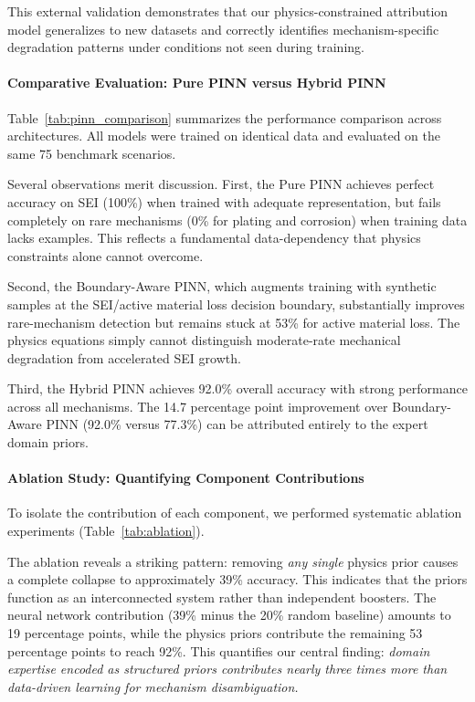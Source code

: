 \documentclass[5p,times,authoryear]{elsarticle}
\begin{document}
This external validation demonstrates that our physics-constrained attribution model generalizes to new datasets and correctly identifies mechanism-specific degradation patterns under conditions not seen during training.

\paragraph{Comparative Evaluation: Pure PINN versus Hybrid PINN}

Table~\ref{tab:pinn_comparison} summarizes the performance comparison across architectures. All models were trained on identical data and evaluated on the same 75 benchmark scenarios.



Several observations merit discussion. First, the Pure PINN achieves perfect accuracy on SEI (100\%) when trained with adequate representation, but fails completely on rare mechanisms (0\% for plating and corrosion) when training data lacks examples. This reflects a fundamental data-dependency that physics constraints alone cannot overcome.

Second, the Boundary-Aware PINN, which augments training with synthetic samples at the SEI/active material loss decision boundary, substantially improves rare-mechanism detection but remains stuck at 53\% for active material loss. The physics equations simply cannot distinguish moderate-rate mechanical degradation from accelerated SEI growth.

Third, the Hybrid PINN achieves 92.0\% overall accuracy with strong performance across all mechanisms. The 14.7 percentage point improvement over Boundary-Aware PINN (92.0\% versus 77.3\%) can be attributed entirely to the expert domain priors.


\paragraph{Ablation Study: Quantifying Component Contributions}

To isolate the contribution of each component, we performed systematic ablation experiments (Table~\ref{tab:ablation}).



The ablation reveals a striking pattern: removing \textit{any single} physics prior causes a complete collapse to approximately 39\% accuracy. This indicates that the priors function as an interconnected system rather than independent boosters. The neural network contribution (39\% minus the 20\% random baseline) amounts to 19 percentage points, while the physics priors contribute the remaining 53 percentage points to reach 92\%. This quantifies our central finding: \textit{domain expertise encoded as structured priors contributes nearly three times more than data-driven learning for mechanism disambiguation.}
\end{document}
